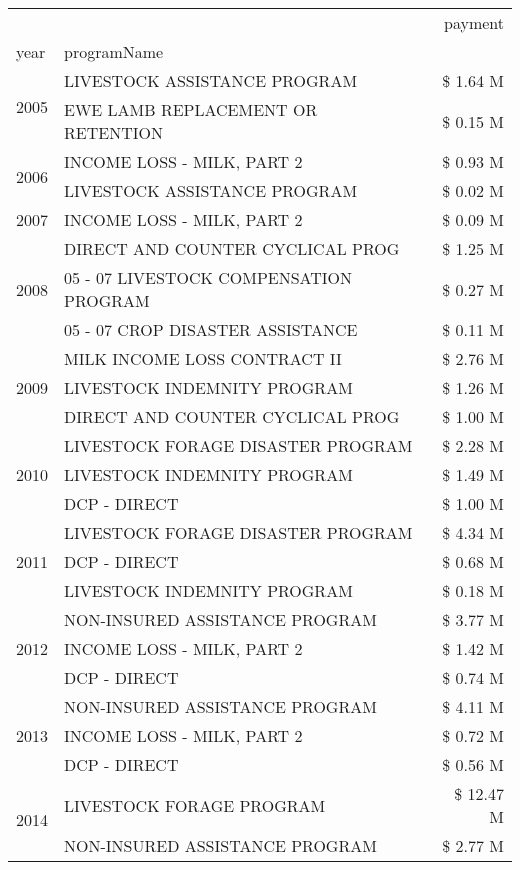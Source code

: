 \begin{tabular}{llr}
\toprule
 &  & payment \\
year & programName &  \\
\midrule
\multirow[t]{2}{*}{2005} & LIVESTOCK ASSISTANCE PROGRAM & \$ 1.64 M \\
 & EWE LAMB REPLACEMENT OR RETENTION & \$ 0.15 M \\
\cline{1-3}
\multirow[t]{2}{*}{2006} & INCOME LOSS - MILK, PART 2 & \$ 0.93 M \\
 & LIVESTOCK ASSISTANCE PROGRAM & \$ 0.02 M \\
\cline{1-3}
2007 & INCOME LOSS - MILK, PART 2 & \$ 0.09 M \\
\cline{1-3}
\multirow[t]{3}{*}{2008} & DIRECT AND COUNTER CYCLICAL PROG & \$ 1.25 M \\
 & 05 - 07 LIVESTOCK COMPENSATION PROGRAM & \$ 0.27 M \\
 & 05 - 07 CROP DISASTER ASSISTANCE & \$ 0.11 M \\
\cline{1-3}
\multirow[t]{3}{*}{2009} & MILK INCOME LOSS CONTRACT II & \$ 2.76 M \\
 & LIVESTOCK INDEMNITY PROGRAM & \$ 1.26 M \\
 & DIRECT AND COUNTER CYCLICAL PROG & \$ 1.00 M \\
\cline{1-3}
\multirow[t]{3}{*}{2010} & LIVESTOCK FORAGE DISASTER PROGRAM & \$ 2.28 M \\
 & LIVESTOCK INDEMNITY PROGRAM & \$ 1.49 M \\
 & DCP - DIRECT & \$ 1.00 M \\
\cline{1-3}
\multirow[t]{3}{*}{2011} & LIVESTOCK FORAGE DISASTER PROGRAM & \$ 4.34 M \\
 & DCP - DIRECT & \$ 0.68 M \\
 & LIVESTOCK INDEMNITY PROGRAM & \$ 0.18 M \\
\cline{1-3}
\multirow[t]{3}{*}{2012} & NON-INSURED ASSISTANCE PROGRAM & \$ 3.77 M \\
 & INCOME LOSS - MILK, PART 2 & \$ 1.42 M \\
 & DCP - DIRECT & \$ 0.74 M \\
\cline{1-3}
\multirow[t]{3}{*}{2013} & NON-INSURED ASSISTANCE PROGRAM & \$ 4.11 M \\
 & INCOME LOSS - MILK, PART 2 & \$ 0.72 M \\
 & DCP - DIRECT & \$ 0.56 M \\
\cline{1-3}
\multirow[t]{3}{*}{2014} & LIVESTOCK FORAGE PROGRAM & \$ 12.47 M \\
 & NON-INSURED ASSISTANCE PROGRAM & \$ 2.77 M \\

\end{tabular}
